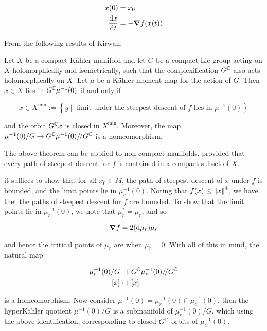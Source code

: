 \documentclass{report}
\newcommand{\sslash}{/\!/}
\begin{document}
\begin{align*}
    x(0) &= x_0 \\
    \dv{x}{t} &= -\grad f(x(t))
\end{align*}

From the following results of Kirwan,

\begin{theorem}
     Let \(X\) be a compact K\"ahler manifold and let \(G\) be a compact Lie group acting on \(X\) holomorphically and isometrically, such that the complexification \(G^{\mathbb{C}}\) also acts holomorphically on \(X\). Let \(\mu\) be a K\"ahler moment map for the action of \(G\). Then \(x \in X\) lies in \(G^{\mathbb{C}}\mu^{-1}(0)\) if and only if

    \[x \in X^{\min} := \left\{y \mid \text{ limit under the steepest descent of }f\text{ lies in }\mu^{-1}(0)\right\}\]

    and the orbit \(G^{\mathbb{C}} x\) is closed in \(X^{\min}\). Moreover, the map \(\mu^{-1}(0)/G \to G^\C\mu^{-1}(0)\sslash G^\C\) is a homeomorphism.
\end{theorem}

\begin{proposition}
    The above theorem can be applied to non-compact manifolds, provided that every path of steepest descent for \(f\) is contained in a compact subset of \(X\).
\end{proposition}

it suffices to show that for all \(x_0 \in M\), the path of steepest descent of \(x\) under \(f\) is bounded, and the limit points lie in \(\mu_r^{-1}(0)\). Noting that \(f(x) \le \norm{x}^4\), we have thet the paths of steepest descent for \(f\) are bounded. To show that the limit points lie in \(\mu_r^{-1}(0)\), we note that \(\mu_r^* = \mu_r\), and so 

\[\grad f = 2(\dd\mu_r)\mu_r\]

and hence the critical points of \(\mu_r\) are when \(\mu_r = 0\). With all of this in mind, the natural map

\begin{align*}
    \mu_r^{-1}(0)/G &\to G^\C\mu_r^{-1}(0)\sslash G^\C \\
    [x] &\mapsto [x]
\end{align*}

is a homeomorphism. Now consider \(\mu^{-1}(0) = \mu_r^{-1}(0) \cap \mu_c^{-1}(0)\), then the hyperK\"ahler quotient \(\mu^{-1}(0)/G\) is a submanifold of \(\mu_r^{-1}(0)/G\), which using the above identification, corresponding to closed \(G^{\mathbb{C}}\) orbits of \(\mu_c^{-1}(0)\).
\end{document}
